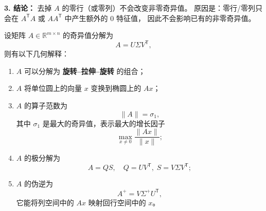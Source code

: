 \textbf{3. 结论：}  
去掉 $A$ 的零行（或零列）不会改变非零奇异值。  
原因是：零行/零列只会在 $A^{\mathsf T}A$ 或 $AA^{\mathsf T}$ 中产生额外的 $0$ 特征值，  
因此不会影响已有的非零奇异值。
\begin{proposition}
设矩阵 $A \in \mathbb{R}^{m \times n}$ 的奇异值分解为 
\[
A = U \Sigma V^{\mathsf T},
\]
则有以下几何解释：
\begin{enumerate}
  \item $A$ 可以分解为 \textbf{旋转–拉伸–旋转} 的组合；
  \item $A$ 将单位圆上的向量 $x$ 变换到椭圆上的 $Ax$；
  \item $A$ 的算子范数为
  \[
  \|A\| = \sigma_1,
  \]
  其中 $\sigma_1$ 是最大的奇异值，表示最大的增长因子
  \[
  \max_{x \neq 0} \frac{\|Ax\|}{\|x\|};
  \]
  \item $A$ 的极分解为
  \[
  A = QS, \quad Q = UV^{\mathsf T}, \; S = V \Sigma V^{\mathsf T};
  \]
  \item $A$ 的伪逆为
  \[
  A^{+} = V \Sigma^{+} U^{\mathsf T},
  \]
  它能将列空间中的 $Ax$ 映射回行空间中的 $x$。
\end{enumerate}
\end{proposition}





